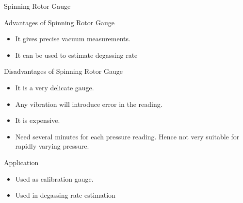 \documentclass[11pt]{beamer}
\begin{document}
\begin{frame}{Spinning Rotor Gauge}

	\begin{block}{Advantages of Spinning Rotor Gauge}
      
        \begin{itemize}
          \item     It gives precise vacuum measurements.     
          \item     It can be used to estimate degassing rate
          
        \end{itemize}
	
	\end{block}

\begin{block}{Disadvantages of Spinning Rotor Gauge}
      
        \begin{itemize}
          \item    It is a very delicate gauge.     
          \item    Any vibration will introduce error in the reading.
          \item    It is expensive.
          \item    Need several minutes for each pressure reading. Hence not very suitable for rapidly varying pressure.
          
        \end{itemize}
	
	\end{block}

\begin{block}{Application}
      
        \begin{itemize}
          \item    Used as calibration gauge.      
          \item    Used in degassing rate  estimation
         
          
        \end{itemize}
	
	\end{block}




\end{frame}
\end{document}
